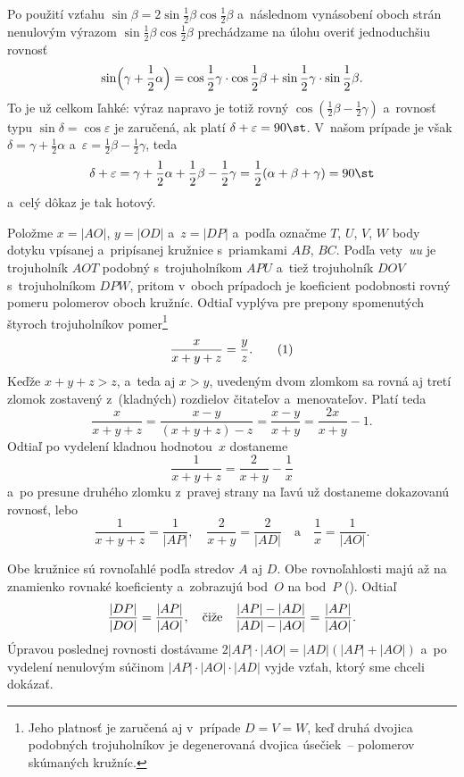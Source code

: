 {Po použití vzťahu $\sin\beta=2\sin\frac12\beta\cos\frac12\beta$
a~následnom vynásobení oboch strán
nenulovým výrazom $\sin\frac12\beta\cos\frac12\beta$
prechádzame na úlohu overiť jednoduchšiu rovnosť
$$
\sin\Bigl(\gamma+\frac12\alpha\Bigr)=
\cos\frac12\gamma\cdot\cos\frac12\beta+
\sin\frac12\gamma\cdot\sin\frac12\beta.
$$
To je už celkom ľahké: výraz napravo je totiž rovný
$\cos(\frac12\beta-\frac12\gamma)$ a~rovnosť typu $\sin\delta=\cos\varepsilon$ je
zaručená, ak platí $\delta+\varepsilon=90\st$. V~našom prípade je však
$\delta=\gamma+\frac12\alpha$ a~$\varepsilon=\frac12\beta-\frac12\gamma$, teda
$$
\delta+\varepsilon=\gamma+\frac12\alpha+\frac12\beta-\frac12\gamma=
\frac12(\alpha+\beta+\gamma)=90\st
$$
a~celý dôkaz je tak hotový.


\ineriesenie
Položme $x=|AO|$, $y=|OD|$ a~$z=|DP|$ a~podľa \obr{} označme $T$, $U$, $V$, $W$
body dotyku vpísanej a~pripísanej kružnice
s~priamkami $AB$, $BC$.
%
Podľa vety~{\it uu\/} je trojuholník
$AOT$ podobný s~trojuholníkom $APU$ a~tiež trojuholník $DOV$ s~trojuholníkom $DPW$, pritom
v~oboch prípadoch je koeficient podobnosti rovný pomeru polomerov
oboch kružníc. Odtiaľ vyplýva pre prepony spomenutých štyroch trojuholníkov
pomer\footnote{Jeho platnosť je zaručená aj v~prípade $D=V=W$, keď
druhá dvojica podobných trojuholníkov je degenerovaná dvojica úsečiek~-- polomerov
skúmaných kružníc.}
$$
\frac{x}{x+y+z}=\frac{y}{z}.
\tag1
$$
Keďže $x+y+z>z$, a~teda aj $x>y$,
uvedeným dvom zlomkom sa rovná aj tretí zlomok zostavený
z~(kladných) rozdielov čitateľov a~menovateľov.
Platí teda
$$
\frac{x}{x+y+z}=\frac{x-y}{(x+y+z)-z}=\frac{x-y}{x+y}=
\frac{2x}{x+y}-1.
$$
Odtiaľ po vydelení kladnou hodnotou~$x$ dostaneme
$$
\frac{1}{x+y+z}=\frac{2}{x+y}-\frac{1}{x}
$$
a~po presune druhého zlomku z~pravej strany na ľavú
už dostaneme dokazovanú rovnosť, lebo
$$
\frac{1}{x+y+z}=\frac{1}{|AP|},\quad
\frac{2}{x+y}=\frac{2}{|AD|}\quad\text{a}\quad
\frac{1}{x}=\frac{1}{|AO|}.
$$


\ineriesenie
Obe kružnice sú rovnoľahlé %
podľa stredov $A$ aj $D$.
Obe rovnoľahlosti majú až na znamienko rovnaké koeficienty a~zobrazujú
bod~$O$ na bod~$P$ (\obr). Odtiaľ
$$
{|DP|\over|DO|}={|AP|\over|AO|},
\quad\text{čiže}\quad
{|AP|-|AD|\over|AD|-|AO|}={|AP|\over|AO|}.
$$
Úpravou poslednej rovnosti dostávame $2|AP|\cdot|AO|=|AD|(|AP|+|AO|)$
a~po vydelení nenulovým súčinom $|AP|\cdot|AO|\cdot|AD|$ vyjde vzťah,
ktorý sme chceli dokázať.


}
